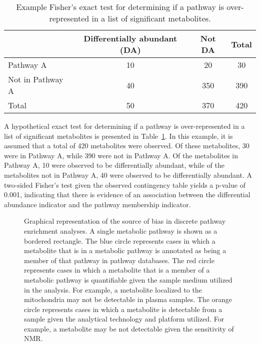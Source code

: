 \begin{DoubleSpace*}
\begin{table}[H]
	\caption[Example Fisher's exact test for determining if a pathway is over-represented in a list of significant metabolites]{\DoubleSpacing Example Fisher's exact test for determining if a pathway is over-represented in a list of significant metabolites. \label{tab:pathExact} }
	\begin{center}
		\begin{tabular}{ l c c c }
			\hline
			& Differentially abundant (DA) & Not DA & Total \\
			\hline
			Pathway A & 10 & 20 & 30 \\
			Not in Pathway A & 40 & 350 &  390 \\
			Total & 50 & 370 & 420\\
			\hline
		\end{tabular}
	\end{center}
\end{table}
A hypothetical exact test for determining if a pathway is over-represented in a list of significant metabolites is presented in Table~\ref{tab:pathExact}. In this example, it is assumed that a total of 420 metabolites were observed. Of these metabolites, 30 were in Pathway A, while 390 were not in Pathway A. Of the metabolites in Pathway A, 10 were observed to be differentially abundant, while of the metabolites not in Pathway A, 40 were observed to be differentially abundant. A two-sided Fisher's test given the observed contingency table yields a p-value of 0.001, indicating that there is evidence of an association between the differential abundance indicator and the pathway membership indicator. 

\begin{figure}[H]
	\caption[Graphical representation of the source of bias in discrete pathway enrichment analyses]{\DoubleSpacing Graphical representation of the source of bias in discrete pathway enrichment analyses. A single metabolic pathway is shown as a bordered rectangle. The blue circle represents cases in which a metabolite that is in a metabolic pathway is annotated as being a member of that pathway in pathway databases. The red circle represents cases in which a metabolite that is a member of a metabolic pathway is quantifiable given the sample medium utilized in the analysis. For example, a metabolite localized to the mitochondria may not be detectable in plasma samples. The orange circle represents cases in which a metabolite is detectable from a sample given the analytical technology and platform utilized. For example, a metabolite may be not detectable given the sensitivity of NMR. \label{fig:vennHell} }
\end{figure}


\end{DoubleSpace*}
